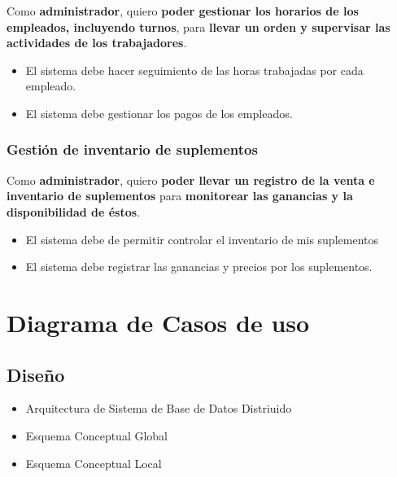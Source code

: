 \documentclass[spanish, 12pt]{article}
\providecommand{\tightlist}{\setlength{\itemsep}{0pt}
\setlength{\parskip}{0pt}}
\begin{document}
	Como \textbf{administrador}, quiero \textbf{poder gestionar los horarios de
	los empleados, incluyendo turnos}, para \textbf{llevar un orden y supervisar
	las actividades de los trabajadores}.

	\begin{itemize}
		\tightlist

		\item El sistema debe hacer seguimiento de las horas trabajadas por cada empleado.

		\item El sistema debe gestionar los pagos de los empleados.
	\end{itemize}

	\subsubsection{Gestión de inventario de suplementos}
	\label{gestiuxf3n-de-inventario-de-suplementos}

	Como \textbf{administrador}, quiero \textbf{poder llevar un registro de la
	venta e inventario de suplementos} para \textbf{monitorear las ganancias y la
	disponibilidad de éstos}.

	\begin{itemize}
		\tightlist

		\item El sistema debe de permitir controlar el inventario de mis suplementos

		\item El sistema debe registrar las ganancias y precios por los suplementos.
	\end{itemize}

	\section{Diagrama de Casos de uso}
	\label{diagrama-de-casos-de-uso}

	\subsection{Diseño}
	\label{diseuxf1o}

	\begin{itemize}
		\tightlist

		\item Arquitectura de Sistema de Base de Datos Distriuido

		\item Esquema Conceptual Global

		\item Esquema Conceptual Local
	\end{itemize}
\end{document}
